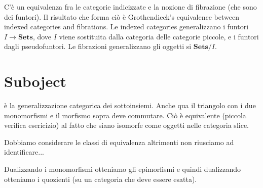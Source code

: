 \documentclass[a4paper]{article}
\begin{document}



C'è un equivalenza fra le categorie indicizzate e la nozione di fibrazione
(che sono dei funtori).
Il risultato che forma ciò è Grothendieck's equivalence between
indexed categories and fibrations.
Le indexed categories generalizzano i funtori \(I \to \mathbf{Sets}\),
dove \(I\) viene sostituita dalla categoria delle categorie piccole,
e i funtori dagli pseudofuntori.
Le fibrazioni generalizzano gli oggetti si \(\mathbf{Sets}/I\).

\section{Suboject}

è la generalizzazione categorica dei sottoinsiemi.
Anche qua il triangolo con i due monomorfismi e il morfismo sopra deve commutare.
Ciò è equivalente (piccola verifica esericizio)
al fatto che siano isomorfe come oggetti nelle categoria slice.

Dobbiamo considerare le classi di equivalenza altrimenti non riusciamo
ad identificare...

Dualizzando i monomorfismi otteniamo gli epimorfismi e quindi dualizzando
otteniamo i quozienti (su un categoria che deve essere esatta).
\end{document}
